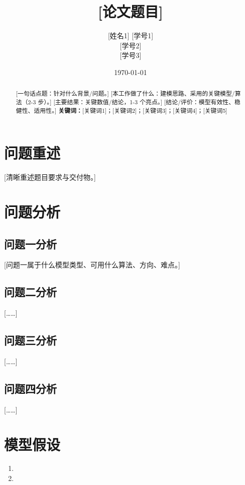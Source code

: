 \documentclass[12pt,a4paper]{article}
\title{[论文题目]}
\author{[姓名1] [学号1]\\[姓名2] [学号2]\\[姓名3] [学号3]}
\date{\today}
\begin{document}
\maketitle
\begin{abstract}
[一句话点题：针对什么背景/问题。]
[本工作做了什么：建模思路、采用的关键模型/算法（2-3 步）。]
[主要结果：关键数值/结论，1-3 个亮点。]
[结论/评价：模型有效性、稳健性、适用性。]
\textbf{关键词：}[关键词1]；[关键词2]；[关键词3]；[关键词4]；[关键词5]
\end{abstract}

\section{问题重述}
[清晰重述题目要求与交付物。]

\section{问题分析}
\subsection{问题一分析}
[问题一属于什么模型类型、可用什么算法、方向、难点。]
\subsection{问题二分析}
[……]
\subsection{问题三分析}
[……]
\subsection{问题四分析}
[……]

\section{模型假设}
\begin{enumerate}
    \item [假设1：……（不成立的后果：……）]
    \item [假设2：……]
\end{enumerate}
\end{document}
